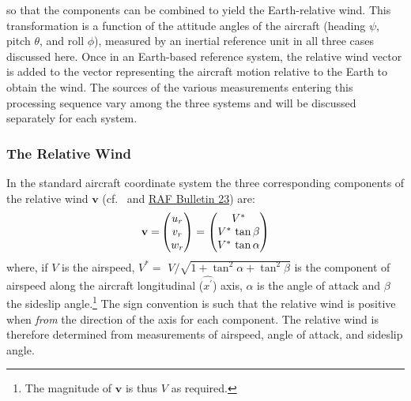 \documentclass[12pt,twoside,english]{article}\usepackage[]{graphicx}\usepackage[]{color}
\let\OrgIndex\index
\renewcommand*{\index}[1]{\OrgIndex{#1}}
\providecommand{\DIFaddbegin}{} %
\providecommand{\DIFaddend}{} %
\providecommand{\DIFdelend}{} %
\begin{document}
\DIFdelend \DIFaddbegin {}\DIFaddend so that the components can be combined to yield the Earth-relative wind. This transformation is a function of the attitude angles of the aircraft (heading $\psi$, pitch $\theta$, and roll $\phi$), measured by an inertial reference unit in all three cases discussed here. Once in an Earth-based reference system, the relative wind vector is added to the vector representing the aircraft motion relative to the Earth to obtain the wind. The sources of the various measurements entering this processing sequence vary among the three systems and will be discussed separately for each system. 


\subsubsection{The Relative Wind\label{sub:The-Relative-Wind}}

In the standard aircraft coordinate system the three corresponding components of the relative wind $\mathbf{v}$ (cf.~\citet{NCAR_OpenSky_TECH-NOTE-000-000-000-064} and \href{https://www.eol.ucar.edu/raf/Bulletins/bulletin23.html}{RAF Bulletin 23}) are:\\
\begin{equation}
\mathbf{v=}\begin{pmatrix}u_{r}\\ v_{r}\\ w_{r} 
\end{pmatrix}=\begin{pmatrix}V^{*}\\ V^{*}\thinspace\tan\beta\\ V^{*}\thinspace\tan\alpha 
\end{pmatrix}\label{eq:relative wind}
\end{equation}
where, if $V$ is the airspeed, $V^{*}=$ $V/\sqrt{1+\tan^{2}\alpha+\tan^{2}\beta}$ is the component of airspeed along the aircraft longitudinal ($\hat{x^{\prime}}$) axis, $\alpha$ is the angle of attack and $\beta$ the sideslip angle.\footnote{The magnitude of $\mathbf{v}$ is thus $V$ as required.} The sign convention is such that the relative wind is positive when \emph{from} the direction of the axis for each component. The relative wind is therefore determined from measurements of airspeed, angle of attack, and sideslip angle. 
\end{document}
